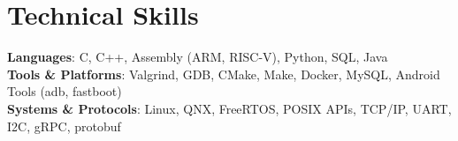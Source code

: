 \section{Technical Skills}
 \begin{itemize}[leftmargin=0.15in, label={}]
    \small{\item{
                 \textbf{Languages}{: C, C++, Assembly (ARM, RISC-V), Python, SQL, Java} \\
                 \textbf{Tools \& Platforms}{: Valgrind, GDB, CMake, Make, Docker, MySQL, Android Tools (adb, fastboot)} \\
                 \textbf{Systems \& Protocols}{: Linux, QNX, FreeRTOS, POSIX APIs, TCP/IP, UART, I2C, gRPC, protobuf}
            }
        }
 \end{itemize}